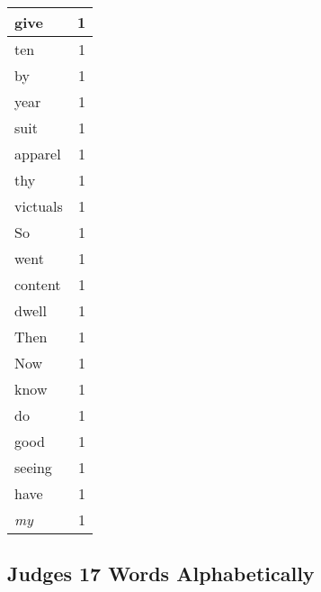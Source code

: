 \begin{center}
\begin{longtable}{l|r}
give & 1\\ \hline 
ten & 1\\ \hline 
by & 1\\ \hline 
year & 1\\ \hline 
suit & 1\\ \hline 
apparel & 1\\ \hline 
thy & 1\\ \hline 
victuals & 1\\ \hline 
So & 1\\ \hline 
went & 1\\ \hline 
content & 1\\ \hline 
dwell & 1\\ \hline 
Then & 1\\ \hline 
Now & 1\\ \hline 
know & 1\\ \hline 
do & 1\\ \hline 
good & 1\\ \hline 
seeing & 1\\ \hline 
have & 1\\ \hline 
\emph{my} & 1\\ \hline 
\end{longtable}
\end{center}





\subsection{Judges 17 Words Alphabetically}


\normalsize
 
